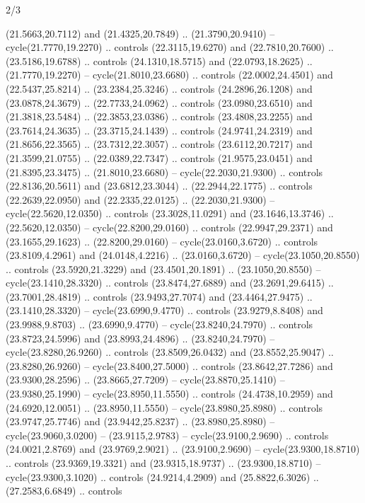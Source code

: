 \begin{flagdescription}{2/3}
\begin{scope}[yshift=\flagwidth,scale=\flagwidth/1241.93737]
\begin{scope}[y=-1mm, x=1mm,draw=gold,fill=blue,line join=miter,miter limit=4,line width=1.8\lw]
\begin{scope}[y=1mm, x=1mm, yscale=-1,shift={(573.68mm+\str,145.75)}]
\begin{scope}[scale=1.35,shift={(-9,-3)}]
\begin{scope}[scale=0.55]
\begin{scope}[scale=1.333]
    (21.5663,20.7112) and (21.4325,20.7849) .. (21.3790,20.9410) --
    cycle(21.7770,19.2270) .. controls (22.3115,19.6270) and (22.7810,20.7600) ..
    (23.5186,19.6788) .. controls (24.1310,18.5715) and (22.0793,18.2625) ..
    (21.7770,19.2270) -- cycle(21.8010,23.6680) .. controls (22.0002,24.4501) and
    (22.5437,25.8214) .. (23.2384,25.3246) .. controls (24.2896,26.1208) and
    (23.0878,24.3679) .. (22.7733,24.0962) .. controls (23.0980,23.6510) and
    (21.3818,23.5484) .. (22.3853,23.0386) .. controls (23.4808,23.2255) and
    (23.7614,24.3635) .. (23.3715,24.1439) .. controls (24.9741,24.2319) and
    (21.8656,22.3565) .. (23.7312,22.3057) .. controls (23.6112,20.7217) and
    (21.3599,21.0755) .. (22.0389,22.7347) .. controls (21.9575,23.0451) and
    (21.8395,23.3475) .. (21.8010,23.6680) -- cycle(22.2030,21.9300) .. controls
    (22.8136,20.5611) and (23.6812,23.3044) .. (22.2944,22.1775) .. controls
    (22.2639,22.0950) and (22.2335,22.0125) .. (22.2030,21.9300) --
    cycle(22.5620,12.0350) .. controls (23.3028,11.0291) and (23.1646,13.3746) ..
    (22.5620,12.0350) -- cycle(22.8200,29.0160) .. controls (22.9947,29.2371) and
    (23.1655,29.1623) .. (22.8200,29.0160) -- cycle(23.0160,3.6720) .. controls
    (23.8109,4.2961) and (24.0148,4.2216) .. (23.0160,3.6720) --
    cycle(23.1050,20.8550) .. controls (23.5920,21.3229) and (23.4501,20.1891) ..
    (23.1050,20.8550) -- cycle(23.1410,28.3320) .. controls (23.8474,27.6889) and
    (23.2691,29.6415) .. (23.7001,28.4819) .. controls (23.9493,27.7074) and
    (23.4464,27.9475) .. (23.1410,28.3320) -- cycle(23.6990,9.4770) .. controls
    (23.9279,8.8408) and (23.9988,9.8703) .. (23.6990,9.4770) --
    cycle(23.8240,24.7970) .. controls (23.8723,24.5996) and (23.8993,24.4896) ..
    (23.8240,24.7970) -- cycle(23.8280,26.9260) .. controls (23.8509,26.0432) and
    (23.8552,25.9047) .. (23.8280,26.9260) -- cycle(23.8400,27.5000) .. controls
    (23.8642,27.7286) and (23.9300,28.2596) .. (23.8665,27.7209) --
    cycle(23.8870,25.1410) -- (23.9380,25.1990) -- cycle(23.8950,11.5550) ..
    controls (24.4738,10.2959) and (24.6920,12.0051) .. (23.8950,11.5550) --
    cycle(23.8980,25.8980) .. controls (23.9747,25.7746) and (23.9442,25.8237) ..
    (23.8980,25.8980) -- cycle(23.9060,3.0200) -- (23.9115,2.9783) --
    cycle(23.9100,2.9690) .. controls (24.0021,2.8769) and (23.9769,2.9021) ..
    (23.9100,2.9690) -- cycle(23.9300,18.8710) .. controls (23.9369,19.3321) and
    (23.9315,18.9737) .. (23.9300,18.8710) -- cycle(23.9300,3.1020) .. controls
    (24.9214,4.2909) and (25.8822,6.3026) .. (27.2583,6.6849) .. controls

\end{scope}
\end{scope}
\end{scope}
\end{scope}
\end{scope}
\end{scope}
\end{flagdescription}
